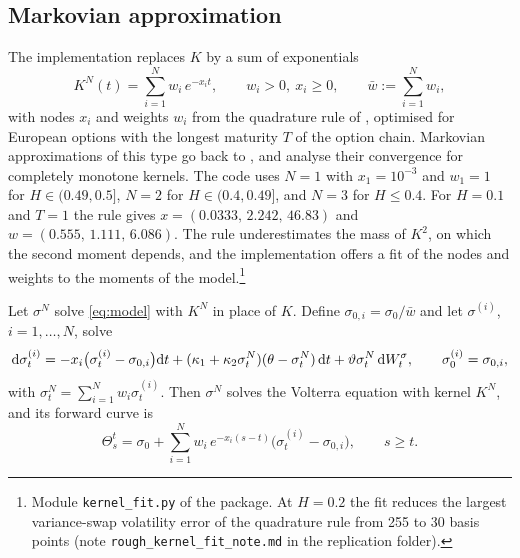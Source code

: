 \subsection{Markovian approximation}

The implementation replaces $K$ by a sum of exponentials
\begin{equation}\label{eq:kernel_N}
K^N(t)=\sum_{i=1}^N w_i\,e^{-x_i t},\qquad w_i>0,\ x_i\ge0,\qquad \bar w:=\sum_{i=1}^N w_i ,
\end{equation}
with nodes $x_i$ and weights $w_i$ from the quadrature rule of \citet{BayerBreneis2023}, optimised for European options with the longest maturity $T$ of the option chain. Markovian approximations of this type go back to \citet{AbiJaberElEuch2019}, and \citet{AlfonsiKebaier2024} analyse their convergence for completely monotone kernels. The code uses $N=1$ with $x_1=10^{-3}$ and $w_1=1$ for $H\in(0.49,0.5]$, $N=2$ for $H\in(0.4,0.49]$, and $N=3$ for $H\le0.4$. For $H=0.1$ and $T=1$ the rule gives $x=(0.0333,\,2.242,\,46.83)$ and $w=(0.555,\,1.111,\,6.086)$.
The rule underestimates the mass of $K^2$, on which the second moment depends, and the implementation offers a fit of the nodes and weights to the moments of the model.\footnote{Module \texttt{kernel\_fit.py} of the package. At $H=0.2$ the fit reduces the largest variance-swap volatility error of the quadrature rule from 255 to 30 basis points (note \texttt{rough\_kernel\_fit\_note.md} in the replication folder).}

\begin{lemma}\label{lem:factors}
Let $\sigma^N$ solve \eqref{eq:model} with $K^N$ in place of $K$. Define $\sigma_{0,i}=\sigma_0/\bar w$ and let $\sigma^{(i)}$, $i=1,\dots,N$, solve
\begin{equation}\label{eq:factors}
\D\sigma^{(i)}_t=-x_i\big(\sigma^{(i)}_t-\sigma_{0,i}\big)\D t+(\kappa_1+\kappa_2\sigma^N_t)(\theta-\sigma^N_t)\,\D t+\vartheta\sigma^N_t\,\D W^\sigma_t,\qquad \sigma^{(i)}_0=\sigma_{0,i},
\end{equation}
with $\sigma^N_t=\sum_{i=1}^N w_i\sigma^{(i)}_t$. Then $\sigma^N$ solves the Volterra equation with kernel $K^N$, and its forward curve is
\begin{equation}\label{eq:theta_N}
\Theta^{t}_s=\sigma_0+\sum_{i=1}^N w_i\,e^{-x_i(s-t)}\big(\sigma^{(i)}_t-\sigma_{0,i}\big),\qquad s\ge t .
\end{equation}
\end{lemma}

